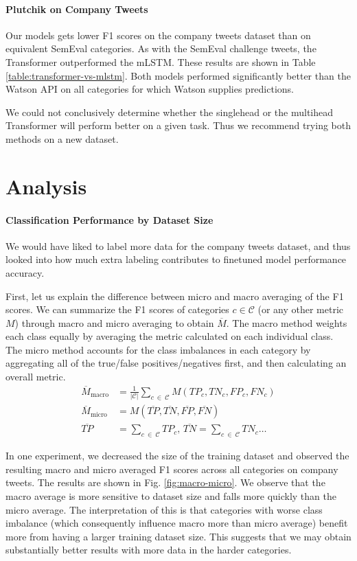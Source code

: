 \documentclass[letterpaper]{article} %
\begin{document}
\paragraph{Plutchik on Company Tweets}
Our models gets lower F1 scores on  the company tweets dataset than on equivalent SemEval categories. 
As with the SemEval challenge tweets, the Transformer outperformed the mLSTM. These results are shown in Table \ref{table:transformer-vs-mlstm}. Both models performed significantly better than the Watson API on all categories for which Watson supplies predictions.

We could not conclusively determine whether the singlehead or the multihead Transformer will perform better on a given task. Thus we recommend trying both methods on a new dataset.


\section{Analysis}

\paragraph{Classification Performance by Dataset Size}
We would have liked to label more data for the company tweets dataset, and thus looked into how much extra labeling contributes to finetuned model performance accuracy. 

First, let us explain the difference between micro and macro averaging of the F1 scores. We can summarize the F1 scores of categories $c \in \mathcal{C}$ (or any other metric $M$) through macro and micro averaging to obtain $\overline{M}$. The macro method weights each class equally by averaging the metric calculated on each individual class. The micro method accounts for the class imbalances in each category by aggregating all of the true/false positives/negatives first, and then calculating an overall metric. 
\begin{align*}
\overline{M}_{\text{macro}} &= \frac{1}{|\mathcal{C}|} \sum_{c \: \in \: \mathcal{C}} M(TP_c, TN_c, FP_c, FN_c) \\
\overline{M}_{\text{micro}} &= M(\overline{TP}, \overline{TN}, \overline{FP}, \overline{FN}) \\
\overline{TP} &= \sum_{c \: \in \: \mathcal{C}} TP_c, \,  \overline{TN} = \sum_{c \: \in \: \mathcal{C}} TN_c\ldots
\end{align*}

In one experiment, we decreased the size of the training dataset and observed the resulting macro and micro averaged F1 scores across all categories on company tweets. The results are shown in Fig. \ref{fig:macro-micro}. We observe that the macro average is more sensitive to dataset size and falls more quickly than the micro average. The interpretation of this is that categories with worse class imbalance (which consequently influence macro more than micro average) benefit more from having a larger training dataset size. This suggests that we may obtain substantially better results with more data in the harder categories.
\end{document}

